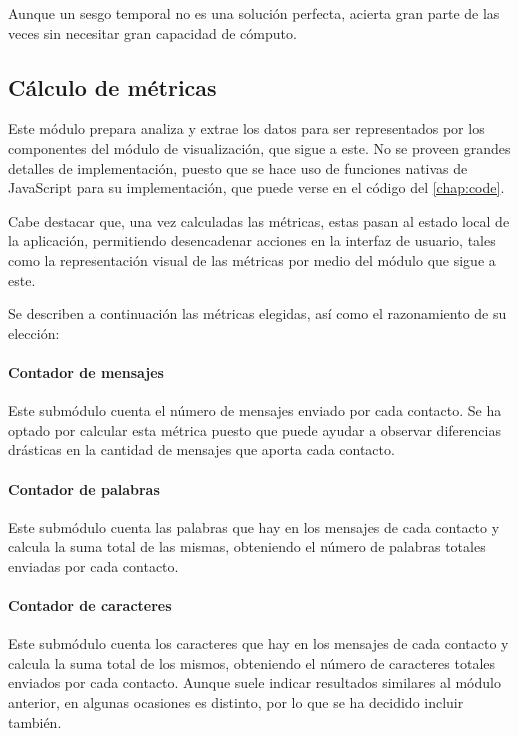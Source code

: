Aunque un sesgo temporal no es una solución perfecta, acierta gran parte de las veces sin necesitar gran capacidad de cómputo.

\subsection{Cálculo de métricas}
\label{chap:architecture_metrics}

Este módulo prepara analiza y extrae los datos para ser representados por los componentes del módulo de visualización, que sigue a este. No se proveen grandes detalles de implementación, puesto que se hace uso de funciones nativas de JavaScript para su implementación, que puede verse en el código del \autoref{chap:code}. 

Cabe destacar que, una vez calculadas las métricas, estas pasan al estado local de la aplicación, permitiendo desencadenar acciones en la interfaz de usuario, tales como la representación visual de las métricas por medio del módulo que sigue a este.

Se describen a continuación las métricas elegidas, así como el razonamiento de su elección:

\paragraph{Contador de mensajes}

Este submódulo cuenta el número de mensajes enviado por cada contacto. Se ha optado por calcular esta métrica puesto que puede ayudar a observar diferencias drásticas en la cantidad de mensajes que aporta cada contacto.

\paragraph{Contador de palabras}

Este submódulo cuenta las palabras que hay en los mensajes de cada contacto y calcula la suma total de las mismas, obteniendo el número de palabras totales enviadas por cada contacto.

\paragraph{Contador de caracteres}

Este submódulo cuenta los caracteres que hay en los mensajes de cada contacto y calcula la suma total de los mismos, obteniendo el número de caracteres totales enviados por cada contacto. Aunque suele indicar resultados similares al módulo anterior, en algunas ocasiones es distinto, por lo que se ha decidido incluir también.

